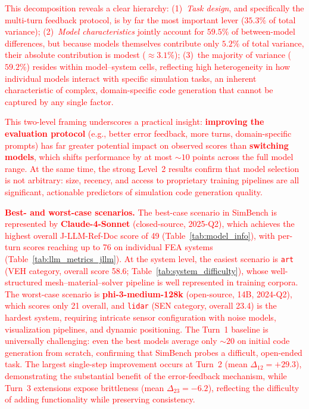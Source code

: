 \documentclass{ieeeaccess}
\newcommand{\updatedText}[1]{\textcolor{red}{#1}}
\newcommand{\noindentBold}[1]{\par\noindent\textbf{#1}}
\begin{document}
\updatedText{This decomposition reveals a clear hierarchy:
(1)~\emph{Task design}, and specifically the multi-turn
feedback protocol, is by far the most important lever
($35.3\%$ of total variance);
(2)~\emph{Model characteristics} jointly account for $59.5\%$
of between-model differences, but because models themselves contribute
only $5.2\%$ of total variance, their absolute contribution is modest
(${\approx}3.1\%$);
(3)~the majority of variance ($59.2\%$) resides within model--system cells,
reflecting high heterogeneity in how individual models interact with
specific simulation tasks, an inherent characteristic of complex,
domain-specific code generation that cannot be captured by any single factor.}

\updatedText{This two-level framing underscores a practical insight:
\textbf{improving the evaluation protocol} (e.g., better error feedback,
more turns, domain-specific prompts) has far greater potential impact
on observed scores than \textbf{switching models}, which shifts
performance by at most ${\sim}10$ points across the full model range.
At the same time, the strong Level~2 results confirm that model selection
is not arbitrary: size, recency, and access to proprietary training
pipelines are all significant, actionable predictors of simulation code
generation quality.}

\medskip
\updatedText{\noindentBold{Best- and worst-case scenarios.}
The best-case scenario in SimBench is represented by
\textbf{Claude-4-Sonnet} (closed-source, 2025-Q2), which achieves the
highest overall J-LLM-Ref-Doc score of 49 (Table~\ref{tab:model_info}),
with per-turn scores reaching up to 76 on individual FEA systems
(Table~\ref{tab:llm_metrics_jllm}).
At the system level, the easiest scenario is \texttt{art}
(VEH category, overall score 58.6; Table~\ref{tab:system_difficulty}),
whose well-structured mesh--material--solver pipeline is well represented
in training corpora.
The worst-case scenario is \textbf{phi-3-medium-128k} (open-source, 14B,
2024-Q2), which scores only 21 overall, and
\texttt{lidar} (SEN category, overall 23.4) is the hardest system,
requiring intricate sensor configuration with noise models, visualization
pipelines, and dynamic positioning.
The Turn~1 baseline is universally challenging: even the best models
average only ${\sim}20$ on initial code generation from scratch,
confirming that SimBench probes a difficult, open-ended task.
The largest single-step improvement occurs at Turn~2 (mean
$\Delta_{12} = +29.3$), demonstrating the substantial benefit of the
error-feedback mechanism, while Turn~3 extensions expose brittleness
(mean $\Delta_{23} = -6.2$), reflecting the difficulty of adding
functionality while preserving consistency.}
 
\end{document}
